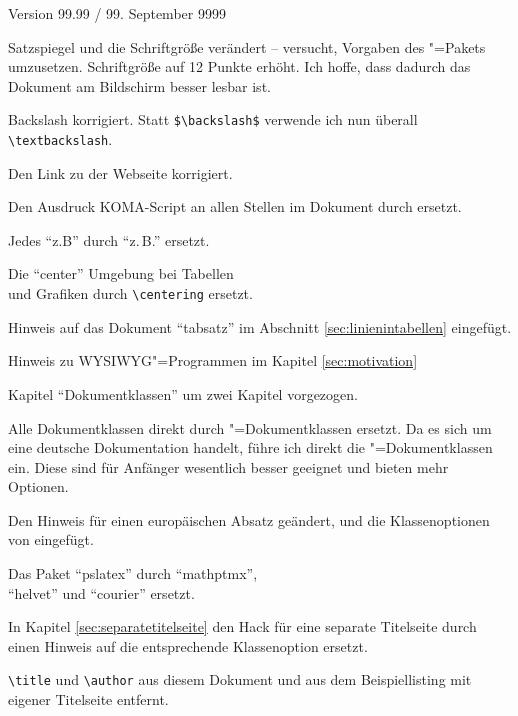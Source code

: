\begin{labeling}{Version 99.99 / 99. September 9999}
\begin{ListChanges}
			\item Satzspiegel und die Schriftgröße verändert -- versucht, Vorgaben des \KOMAScript{}"=Pakets umzusetzen. 
				Schriftgröße auf 12 Punkte erhöht. Ich hoffe, dass dadurch das Dokument am Bildschirm besser lesbar ist.
			\item Backslash korrigiert. Statt \texttt{\$\textbackslash backslash\$} verwende ich nun überall \texttt{\textbackslash textbackslash}.
			\item Den Link zu der \KOMAScript{} Webseite korrigiert.
			\item Den Ausdruck KOMA-Script an allen Stellen im Dokument durch \KOMAScript{} ersetzt.
			\item Jedes \enquote{z.B} durch \enquote{z.\,B.} ersetzt.
			\item Die \enquote{center} Umgebung bei Tabellen\\ und Grafiken durch \texttt{\textbackslash centering} ersetzt.
			\item Hinweis auf das Dokument \enquote{tabsatz} im Abschnitt \ref{sec:linienintabellen} eingefügt.
			\item Hinweis zu WYSIWYG"=Programmen im Kapitel \ref{sec:motivation}
			\item Kapitel \enquote{Dokumentklassen} um zwei Kapitel vorgezogen.
			\item Alle Dokumentklassen direkt durch \KOMAScript{}"=Dokumentklassen ersetzt. 
				Da es sich um eine deutsche Dokumentation handelt, führe ich direkt die \KOMAScript{}"=Dokumentklassen ein. 
				Diese sind für Anfänger wesentlich besser geeignet und bieten mehr Optionen.
			\item Den Hinweis für einen europäischen Absatz geändert, und die Klassenoptionen\\
			 von \KOMAScript{} eingefügt.
			\item Das Paket \enquote{pslatex} durch \enquote{mathptmx},\\
					  \enquote{helvet} und \enquote{courier} ersetzt.
			\item In Kapitel \ref{sec:separatetitelseite} den Hack für eine separate Titelseite durch einen Hinweis auf die entsprechende Klassenoption ersetzt.
			\item \texttt{\textbackslash title} und \texttt{\textbackslash author} aus diesem Dokument und aus dem Beispiellisting mit eigener Titelseite entfernt.
		\end{ListChanges}
	\item[Version 1.7 / 24. Januar 2003]
		\begin{ListChanges}

\end{ListChanges}
\end{labeling}
